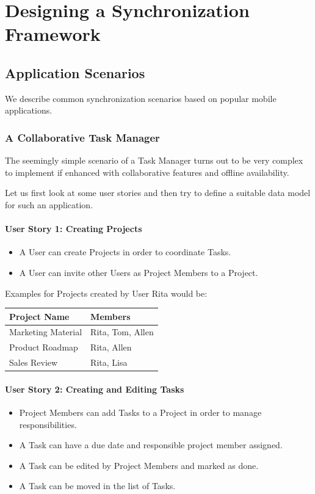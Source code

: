 
\chapter{Designing a Synchronization Framework}\label{main}

\section{Application Scenarios}
We describe common synchronization scenarios based on popular mobile applications.

\subsection{A Collaborative Task Manager}

The seemingly simple scenario of a Task Manager turns out to be very complex to implement if enhanced with collaborative features and offline availability.

Let us first look at some user stories and then try to define a suitable data model for such an application.

\subsubsection{User Story 1: Creating Projects}
\begin{itemize}
\item A User can create Projects in order to coordinate Tasks.
\item A User can invite other Users as Project Members to a Project.
\end{itemize}

Examples for Projects created by User Rita would be:\\

\begin{tabular}{ l l }
Project Name & Members \\
\hline
Marketing Material & Rita, Tom, Allen \\
Product Roadmap & Rita, Allen \\
Sales Review & Rita, Lisa
\end{tabular}

\subsubsection{User Story 2: Creating and Editing Tasks}
\begin{itemize}
\item Project Members can add Tasks to a Project in order to manage responsibilities.
\item A Task can have a due date and responsible project member assigned.
\item A Task can be edited by Project Members and marked as done.
\item A Task can be moved in the list of Tasks.
\end{itemize}

